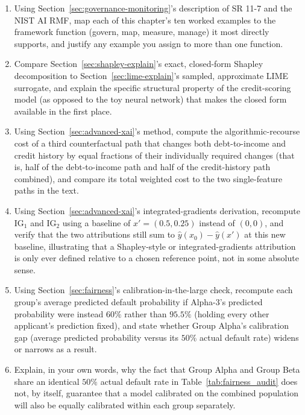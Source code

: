 \documentclass[../ai_in_finance]{subfiles}
\begin{document}
\begin{enumerate}
    \item Using Section~\ref{sec:governance-monitoring}'s description of SR 11-7 and the NIST AI RMF, map each of this chapter's ten worked examples to the framework function (govern, map, measure, manage) it most directly supports, and justify any example you assign to more than one function.
    \item Compare Section~\ref{sec:shapley-explain}'s exact, closed-form Shapley decomposition to Section~\ref{sec:lime-explain}'s sampled, approximate LIME surrogate, and explain the specific structural property of the credit-scoring model (as opposed to the toy neural network) that makes the closed form available in the first place.
    \item Using Section~\ref{sec:advanced-xai}'s method, compute the algorithmic-recourse cost of a third counterfactual path that changes both debt-to-income and credit history by equal fractions of their individually required changes (that is, half of the debt-to-income path and half of the credit-history path combined), and compare its total weighted cost to the two single-feature paths in the text.
    \item Using Section~\ref{sec:advanced-xai}'s integrated-gradients derivation, recompute $\text{IG}_1$ and $\text{IG}_2$ using a baseline of $x' = (0.5, 0.25)$ instead of $(0,0)$, and verify that the two attributions still sum to $\hat y(x_0) - \hat y(x')$ at this new baseline, illustrating that a Shapley-style or integrated-gradients attribution is only ever defined relative to a chosen reference point, not in some absolute sense.
    \item Using Section~\ref{sec:fairness}'s calibration-in-the-large check, recompute each group's average predicted default probability if Alpha-3's predicted probability were instead $60\%$ rather than $95.5\%$ (holding every other applicant's prediction fixed), and state whether Group Alpha's calibration gap (average predicted probability versus its $50\%$ actual default rate) widens or narrows as a result.
    \item Explain, in your own words, why the fact that Group Alpha and Group Beta share an identical $50\%$ actual default rate in Table~\ref{tab:fairness_audit} does not, by itself, guarantee that a model calibrated on the combined population will also be equally calibrated within each group separately.

\end{enumerate}
\end{document}
